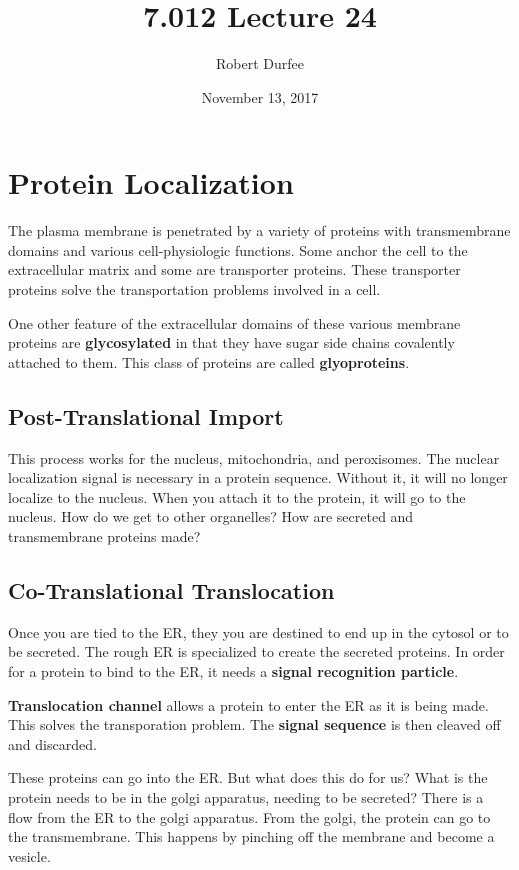 \documentclass{article}
\title{ 7.012 Lecture 24 }
\author{ Robert Durfee }
\date{ November 13, 2017 }
\begin{document}
\maketitle

\section{ Protein Localization }

The plasma membrane is penetrated by a variety of proteins with transmembrane
domains and various cell-physiologic functions. Some anchor the cell to the
extracellular matrix and some are transporter proteins. These transporter
proteins solve the transportation problems involved in a cell. 

One other feature of the extracellular domains of these various membrane
proteins are \textbf{glycosylated} in that they have sugar side chains
covalently attached to them. This class of proteins are called
\textbf{glyoproteins}. 

\subsection{Post-Translational Import}

This process works for the nucleus, mitochondria, and peroxisomes. The nuclear
localization signal is necessary in a protein sequence. Without it, it will no
longer localize to the nucleus. When you attach it to the protein, it will go to
the nucleus. How do we get to other organelles? How are secreted and
transmembrane proteins made?

\subsection{Co-Translational Translocation}

Once you are tied to the ER, they you are destined to end up in the cytosol or
to be secreted. The rough ER is specialized to create the secreted proteins. In
order for a protein to bind to the ER, it needs a \textbf{signal recognition
particle}. 

\textbf{Translocation channel} allows a protein to enter the ER as it is being
made. This solves the transporation problem. The \textbf{signal sequence} is
then cleaved off and discarded.

These proteins can go into the ER. But what does this do for us? What is the
protein needs to be in the golgi apparatus, needing to be secreted? There is a
flow from the ER to the golgi apparatus. From the golgi, the protein can go to
the transmembrane. This happens by pinching off the membrane and become a
vesicle. 
\end{document}
